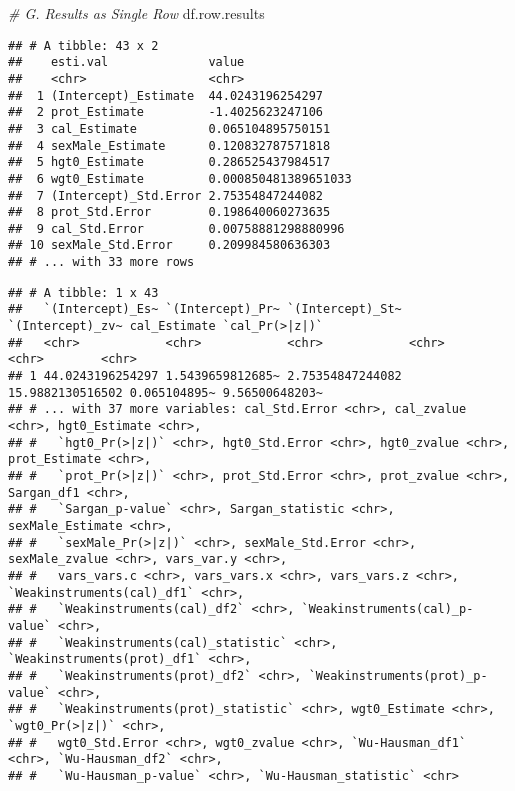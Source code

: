 \documentclass[
]{book}
\newenvironment{Shaded}{\begin{snugshade}}{\end{snugshade}}
\newcommand{\CommentTok}[1]{\textcolor[rgb]{0.56,0.35,0.01}{\textit{#1}}}
\newcommand{\KeywordTok}[1]{\textcolor[rgb]{0.13,0.29,0.53}{\textbf{#1}}}
\newcommand{\NormalTok}[1]{#1}
\newcommand{\OperatorTok}[1]{\textcolor[rgb]{0.81,0.36,0.00}{\textbf{#1}}}
\newcommand{\StringTok}[1]{\textcolor[rgb]{0.31,0.60,0.02}{#1}}
\begin{document}
\begin{Shaded}
\begin{Highlighting}[]
\CommentTok{# G. Results as Single Row}
\NormalTok{df.row.results}
\end{Highlighting}
\end{Shaded}

\begin{verbatim}
## # A tibble: 43 x 2
##    esti.val              value               
##    <chr>                 <chr>               
##  1 (Intercept)_Estimate  44.0243196254297    
##  2 prot_Estimate         -1.4025623247106    
##  3 cal_Estimate          0.065104895750151   
##  4 sexMale_Estimate      0.120832787571818   
##  5 hgt0_Estimate         0.286525437984517   
##  6 wgt0_Estimate         0.000850481389651033
##  7 (Intercept)_Std.Error 2.75354847244082    
##  8 prot_Std.Error        0.198640060273635   
##  9 cal_Std.Error         0.00758881298880996 
## 10 sexMale_Std.Error     0.209984580636303   
## # ... with 33 more rows
\end{verbatim}

\begin{Shaded}
\end{Shaded}

\begin{verbatim}
## # A tibble: 1 x 43
##   `(Intercept)_Es~ `(Intercept)_Pr~ `(Intercept)_St~ `(Intercept)_zv~ cal_Estimate `cal_Pr(>|z|)`
##   <chr>            <chr>            <chr>            <chr>            <chr>        <chr>         
## 1 44.0243196254297 1.5439659812685~ 2.75354847244082 15.9882130516502 0.065104895~ 9.56500648203~
## # ... with 37 more variables: cal_Std.Error <chr>, cal_zvalue <chr>, hgt0_Estimate <chr>,
## #   `hgt0_Pr(>|z|)` <chr>, hgt0_Std.Error <chr>, hgt0_zvalue <chr>, prot_Estimate <chr>,
## #   `prot_Pr(>|z|)` <chr>, prot_Std.Error <chr>, prot_zvalue <chr>, Sargan_df1 <chr>,
## #   `Sargan_p-value` <chr>, Sargan_statistic <chr>, sexMale_Estimate <chr>,
## #   `sexMale_Pr(>|z|)` <chr>, sexMale_Std.Error <chr>, sexMale_zvalue <chr>, vars_var.y <chr>,
## #   vars_vars.c <chr>, vars_vars.x <chr>, vars_vars.z <chr>, `Weakinstruments(cal)_df1` <chr>,
## #   `Weakinstruments(cal)_df2` <chr>, `Weakinstruments(cal)_p-value` <chr>,
## #   `Weakinstruments(cal)_statistic` <chr>, `Weakinstruments(prot)_df1` <chr>,
## #   `Weakinstruments(prot)_df2` <chr>, `Weakinstruments(prot)_p-value` <chr>,
## #   `Weakinstruments(prot)_statistic` <chr>, wgt0_Estimate <chr>, `wgt0_Pr(>|z|)` <chr>,
## #   wgt0_Std.Error <chr>, wgt0_zvalue <chr>, `Wu-Hausman_df1` <chr>, `Wu-Hausman_df2` <chr>,
## #   `Wu-Hausman_p-value` <chr>, `Wu-Hausman_statistic` <chr>
\end{verbatim}
\end{document}
